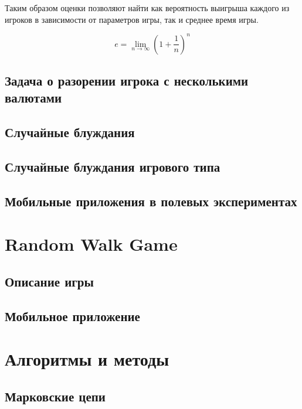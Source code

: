 Таким образом оценки позволяют найти как вероятность выигрыша каждого из игроков в зависимости от параметров игры, так и среднее время игры.

\begin{equation}
    \label{eq:equation1}
    e = \lim_{n \to \infty} \left( 1+\frac{1}{n} \right) ^n
\end{equation}

\subsection{Задача о разорении игрока с несколькими валютами}\label{subsec:ch1/sec1/sub2}

\subsection{Случайные блуждания}\label{subsec:ch1/sec1/sub3}

\subsection{Случайные блуждания игрового типа}\label{subsec:ch1/sec1/sub4}

\subsection{Мобильные приложения в полевых экспериментах}\label{subsec:ch1/sec1/sub5}

\section{Random Walk Game}\label{sec:ch1/sec2}

\subsection{Описание игры}\label{subsec:ch1/sec2/sub1}

\subsection{Мобильное приложение}\label{subsec:ch1/sec2/sub2}

\section{Алгоритмы и методы}\label{sec:ch1/sec3}

\subsection{Марковские цепи}\label{subsec:ch1/sec3/sub1}

